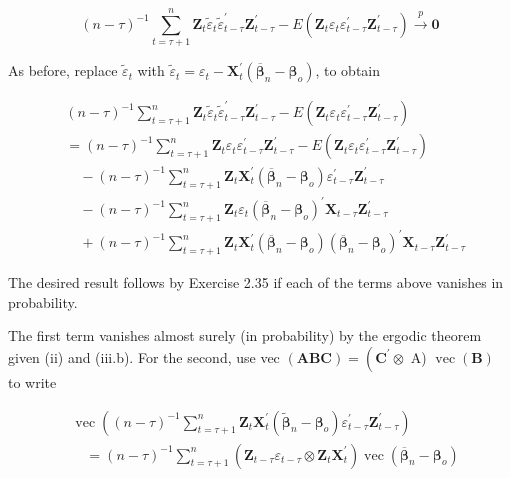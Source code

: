 \documentclass[10pt]{article}
\begin{document}
$$
(n-\tau)^{-1} \sum_{t=\tau+1}^{n} \mathbf{Z}_{t} \tilde{\varepsilon}_{t} \tilde{\varepsilon}_{t-\tau}^{\prime} \mathbf{Z}_{t-\tau}^{\prime}-E\left(\mathbf{Z}_{t} \varepsilon_{t} \varepsilon_{t-\tau}^{\prime} \mathbf{Z}_{t-\tau}^{\prime}\right) \xrightarrow{p} \mathbf{0}
$$

As before, replace $\tilde{\varepsilon}_{t}$ with $\tilde{\varepsilon}_{t}=\varepsilon_{t}-\mathbf{X}_{t}^{\prime}\left(\overline{\boldsymbol{\beta}}_{n}-\boldsymbol{\beta}_{o}\right)$, to obtain

$$
\begin{aligned}
& (n-\tau)^{-1} \sum_{t=\tau+1}^{n} \mathbf{Z}_{t} \tilde{\varepsilon}_{t} \tilde{\varepsilon}_{t-\tau}^{\prime} \mathbf{Z}_{t-\tau}^{\prime}-E\left(\mathbf{Z}_{t} \varepsilon_{t} \varepsilon_{t-\tau}^{\prime} \mathbf{Z}_{t-\tau}^{\prime}\right) \\
& =(n-\tau)^{-1} \sum_{t=\tau+1}^{n} \mathbf{Z}_{t} \varepsilon_{t} \varepsilon_{t-\tau}^{\prime} \mathbf{Z}_{t-\tau}^{\prime}-E\left(\mathbf{Z}_{t} \varepsilon_{t} \varepsilon_{t-\tau}^{\prime} \mathbf{Z}_{t-\tau}^{\prime}\right) \\
& \quad-(n-\tau)^{-1} \sum_{t=\tau+1}^{n} \mathbf{Z}_{t} \mathbf{X}_{t}^{\prime}\left(\overline{\boldsymbol{\beta}}_{n}-\boldsymbol{\beta}_{o}\right) \varepsilon_{t-\tau}^{\prime} \mathbf{Z}_{t-\tau}^{\prime} \\
& \quad-(n-\tau)^{-1} \sum_{t=\tau+1}^{n} \mathbf{Z}_{t} \varepsilon_{t}\left(\overline{\boldsymbol{\beta}}_{n}-\boldsymbol{\beta}_{o}\right)^{\prime} \mathbf{X}_{t-\tau} \mathbf{Z}_{t-\tau}^{\prime} \\
& \quad+(n-\tau)^{-1} \sum_{t=\tau+1}^{n} \mathbf{Z}_{t} \mathbf{X}_{t}^{\prime}\left(\overline{\boldsymbol{\beta}}_{n}-\boldsymbol{\beta}_{o}\right)\left(\overline{\boldsymbol{\beta}}_{n}-\boldsymbol{\beta}_{o}\right)^{\prime} \mathbf{X}_{t-\tau} \mathbf{Z}_{t-\tau}^{\prime}
\end{aligned}
$$

The desired result follows by Exercise 2.35 if each of the terms above vanishes in probability.

The first term vanishes almost surely (in probability) by the ergodic theorem given (ii) and (iii.b). For the second, use vec $(\mathbf{A B C})=\left(\mathbf{C}^{\prime} \otimes\right.$ A) $\operatorname{vec}(\mathbf{B})$ to write

$$
\begin{aligned}
& \operatorname{vec}\left((n-\tau)^{-1} \sum_{t=\tau+1}^{n} \mathbf{Z}_{t} \mathbf{X}_{t}^{\prime}\left(\tilde{\boldsymbol{\beta}}_{n}-\boldsymbol{\beta}_{o}\right) \varepsilon_{t-\tau}^{\prime} \mathbf{Z}_{t-\tau}^{\prime}\right) \\
& \quad=(n-\tau)^{-1} \sum_{t=\tau+1}^{n}\left(\mathbf{Z}_{t-\tau} \varepsilon_{t-\tau} \otimes \mathbf{Z}_{t} \mathbf{X}_{t}^{\prime}\right) \operatorname{vec}\left(\overline{\boldsymbol{\beta}}_{n}-\boldsymbol{\beta}_{o}\right)
\end{aligned}
$$
\end{document}

